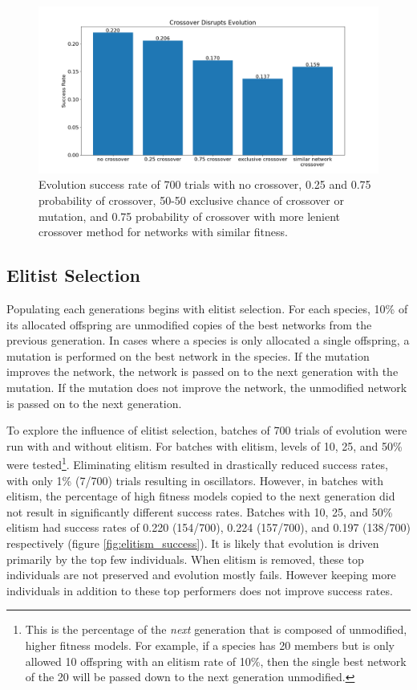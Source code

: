 \documentclass[12pt]{report}
\begin{document}
\begin{figure}
	\centering
    \includegraphics[width=18cm]{images/crossover_success.png}
    \caption[Evolutionary success rate with different crossover strategies]{Evolution success rate of 700 trials with no crossover, 0.25 and 0.75 probability of crossover, 50-50 exclusive chance of crossover or mutation, and 0.75 probability of crossover with more lenient crossover method for networks with similar fitness.}
    \label{fig:crossover_success}
\end{figure}


\subsection{Elitist Selection}
\label{section:elites}
Populating each generations begins with elitist selection. For each species, 10\% of its allocated offspring are unmodified copies of the best networks from the previous generation. In cases where a species is only allocated a single offspring, a mutation is performed on the best network in the species. If the mutation improves the network, the network is passed on to the next generation with the mutation. If the mutation does not improve the network, the unmodified network is passed on to the next generation.

To explore the influence of elitist selection, batches of 700 trials of evolution were run with and without elitism. For batches with elitism, levels of 10, 25, and 50\% were tested\footnote{This is the percentage of the \textit{next} generation that is composed of unmodified, higher fitness models. For example, if a species has 20 members but is only allowed 10 offspring with an elitism rate of 10\%, then the single best network of the 20 will be passed down to the next generation unmodified.}. Eliminating elitism resulted in drastically reduced success rates, with only 1\% (7/700) trials resulting in oscillators. However, in batches with elitism, the percentage of high fitness models copied to the next generation did not result in significantly different success rates. Batches with 10, 25, and 50\% elitism had success rates of 0.220 (154/700), 0.224 (157/700), and 0.197 (138/700) respectively (figure \ref{fig:elitism_success}). It is likely that evolution is driven primarily by the top few individuals. When elitism is removed, these top individuals are not preserved and evolution mostly fails. However keeping more individuals in addition to these top performers does not improve success rates.
\end{document}
